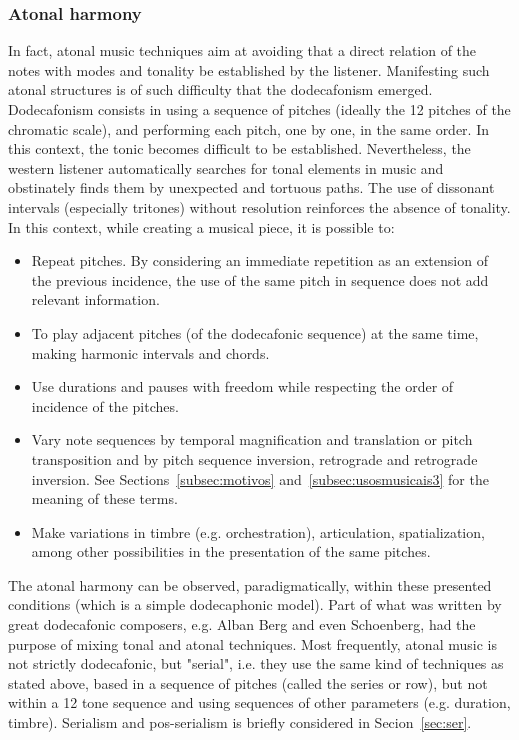 \subsubsection{Atonal harmony}\label{sec:atonal}
In fact, atonal music techniques aim at avoiding that a direct relation of the notes with modes and tonality be established by the listener.
Manifesting such atonal structures is of such difficulty that the dodecafonism emerged.
Dodecafonism consists in using a sequence of pitches (ideally the 12 pitches of the chromatic scale),
and performing each pitch, one by one, in the same
order.
In this context, the tonic becomes difficult to be established.
Nevertheless, the western listener automatically searches for tonal elements in music and obstinately finds them by unexpected and tortuous paths.
The use of dissonant intervals (especially tritones) without resolution reinforces the absence of tonality. In this context, while creating a musical
piece, it is possible to:
\begin{itemize}
     \item Repeat pitches. By considering an immediate repetition as an extension of the previous incidence, the use of the same pitch in sequence does not add relevant information.
     \item To play adjacent pitches (of the dodecafonic sequence) at the same time, making harmonic intervals and chords.
     \item Use durations and pauses with freedom while respecting the order of incidence of the pitches.
     \item Vary note sequences by temporal magnification and translation or pitch transposition and by pitch sequence inversion, retrograde and retrograde inversion. See Sections~\ref{subsec:motivos}
     and~\ref{subsec:usosmusicais3} for the meaning of these terms.
     \item Make variations in timbre (e.g. orchestration), articulation, spatialization, among other possibilities in the presentation of the same pitches.
\end{itemize}

The atonal harmony can be observed, paradigmatically, within these presented conditions (which is a simple dodecaphonic model).
Part of what was written by great dodecafonic composers,
e.g. Alban Berg and even Schoenberg, had the purpose of mixing tonal and atonal techniques.
Most frequently, atonal music is not strictly dodecafonic, but "serial", i.e. they use the same kind of techniques as stated above, based in a sequence of pitches (called the series or row), but not within a 12 tone sequence and using sequences of other parameters (e.g. duration, timbre).
Serialism and pos-serialism is briefly considered in Secion~\ref{sec:ser}.

